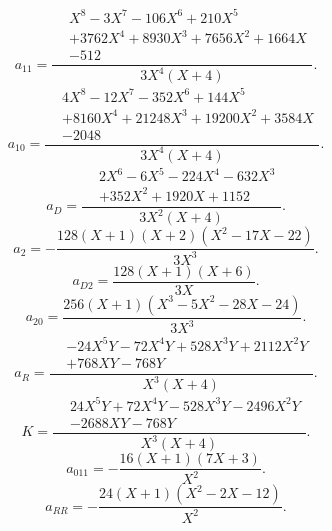 \begin{equation}
a_{11}=\frac{\begin{aligned}&X^{8} - 3 X^{7} - 106 X^{6} + 210 X^{5}\\&+3762 X^{4} + 8930 X^{3} + 7656 X^{2} + 1664 X\\&-512\end{aligned}}{3 X^{4} \left(X + 4\right)}.
\end{equation}
\begin{equation}
a_{10}=\frac{\begin{aligned}&4 X^{8} - 12 X^{7} - 352 X^{6} + 144 X^{5}\\&+8160 X^{4} + 21248 X^{3} + 19200 X^{2} + 3584 X\\&-2048\end{aligned}}{3 X^{4} \left(X + 4\right)}.
\end{equation}
\begin{equation}
a_D=\frac{\begin{aligned}&2 X^{6} - 6 X^{5} - 224 X^{4} - 632 X^{3}\\&+352 X^{2} + 1920 X + 1152\end{aligned}}{3 X^{2} \left(X + 4\right)}.
\end{equation}
\begin{equation}
a_2=- \frac{128 \left(X + 1\right) \left(X + 2\right) \left(X^{2} - 17 X - 22\right)}{3 X^{3}}.
\end{equation}
\begin{equation}
a_{D2}=\frac{128 \left(X + 1\right) \left(X + 6\right)}{3 X}.
\end{equation}
\begin{equation}
a_{20}=\frac{256 \left(X + 1\right) \left(X^{3} - 5 X^{2} - 28 X - 24\right)}{3 X^{3}}.
\end{equation}
\begin{equation}
a_R=\frac{\begin{aligned}&- 24 X^{5} Y - 72 X^{4} Y + 528 X^{3} Y + 2112 X^{2} Y\\&+768 X Y - 768 Y\end{aligned}}{X^{3} \left(X + 4\right)}.
\end{equation}
\begin{equation}
K=\frac{\begin{aligned}&24 X^{5} Y + 72 X^{4} Y - 528 X^{3} Y - 2496 X^{2} Y\\&- 2688 X Y - 768 Y\end{aligned}}{X^{3} \left(X + 4\right)}.
\end{equation}
\begin{equation}
a_{011}=- \frac{16 \left(X + 1\right) \left(7 X + 3\right)}{X^{2}}.
\end{equation}
\begin{equation}
a_{RR}=- \frac{24 \left(X + 1\right) \left(X^{2} - 2 X - 12\right)}{X^{2}}.
\end{equation}
